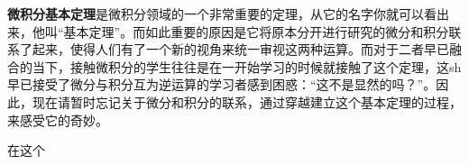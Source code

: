 

\textbf{微积分基本定理}是微积分领域的一个非常重要的定理，从它的名字你就可以看出来，他叫“基本定理”。而如此重要的原因是它将原本分开进行研究的微分和积分联系了起来，使得人们有了一个新的视角来统一审视这两种运算。而对于二者早已融合的当下，接触微积分的学生往往是在一开始学习的时候就接触了这个定理，这sh早已接受了微分与积分互为逆运算的学习者感到困惑：“这不是显然的吗？”。因此，现在请暂时忘记关于微分和积分的联系，通过穿越建立这个基本定理的过程，来感受它的奇妙。

在这个
